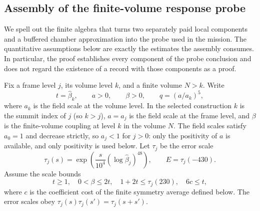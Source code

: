 \subsection{Assembly of the finite-volume response probe}
\label{sec:ex-lattice-trace-probe-assembly}

We spell out the finite algebra that turns two separately paid local
components and a buffered chamber approximation into the probe used in the
mission. The quantitative assumptions below are exactly the estimates the
assembly consumes. In particular, the proof establishes every component of
the probe conclusion and does not regard the existence of a record with
those components as a proof.

Fix a frame level $j$, its volume level $k$, and a finite volume $N>k$.
Write
\[
 t=\widehat\beta_k,\qquad a>0,\qquad \beta>0,\qquad
 q=(a/a_k)^5,
\]
where $a_k$ is the field scale at the volume level. In the selected
construction $k$ is the summit index of $j$ (so $k>j$), $a=a_j$ is the
field scale at the frame level, and $\beta$ is the finite-volume coupling
at level $k$ in the volume $N$. The field scales satisfy $a_0=1$ and
decrease strictly, so $a_j<1$ for $j>0$: only the positivity of $a$ is
available, and only positivity is used below. Let $\tau_j$ be the
error scale
\[
 \tau_j(s)=\exp\!\left(\frac{s}{10^4}
           (\log\widehat\beta_j)^{48}\right),
 \qquad E=\tau_j(-430).
\]
Assume the scale bounds
\begin{equation}
 t\geq1,\quad 0<\beta\leq2t,\quad
 1+2t\leq\tau_j(230),\quad 6c\leq t,
 \label{eq:ex-trace-probe-scales}
\end{equation}
where $c$ is the coefficient cost of the finite symmetry average defined
below. The error scales obey $\tau_j(s)\tau_j(s')=\tau_j(s+s')$.

